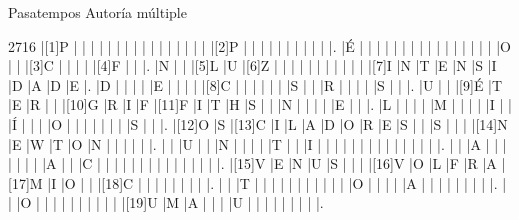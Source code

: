 \Titular*%
{pasatempos}%
{Pasatempos}%
{ Autoría múltiple}%
{}%

\vspace*{-6mm}

\begin{Puzzle}{27}{16}
|[1]P  |{}    |{}    |{}    |{}    |{}    |{}    |{}    |{}    |{}    |{}    |{}    |{}    |{}    |{}    |{}    |{}    |[2]P  |{}    |{}    |{}    |{}    |{}    |{}    |{}    |{}    |{}   |{} |.
|É     |{}    |{}    |{}    |{}    |{}    |{}    |{}    |{}    |{}    |{}    |{}    |{}    |{}    |{}    |{}    |{}    |O     |{}    |{}    |[3]C  |{}    |{}    |{}    |{}    |[4]F  |{}   |{} |.
|N     |{}    |{}    |[5]L  |U     |[6]Z  |{}    |{}    |{}    |{}    |{}    |{}    |{}    |{}    |{}    |{}    |{}    |[7]I  |N     |T     |E     |N     |S     |I     |D     |A     |D    |E  |.
|D     |{}    |{}    |{}    |{}    |E     |{}    |{}    |{}    |{}    |[8]C  |{}    |{}    |{}    |{}    |{}    |{}    |S     |{}    |{}    |R     |{}    |{}    |{}    |{}    |S     |{}   |{} |.
|U     |{}    |{}    |[9]É  |T     |E     |R     |{}    |{}    |[10]G |R     |I     |F     |[11]F |I     |T     |H     |S     |{}    |{}    |N     |{}    |{}    |{}    |{}    |E     |{}   |{} |.
|L     |{}    |{}    |{}    |{}    |M     |{}    |{}    |{}    |{}    |I     |{}    |{}    |Í     |{}    |{}    |{}    |O     |{}    |{}    |{}    |{}    |{}    |{}    |{}    |S     |{}   |{} |.
|[12]O |S     |[13]C |I     |L     |A     |D     |O     |R     |E     |S     |{}    |{}    |S     |{}    |{}    |{}    |[14]N |E     |W     |T     |O     |N     |{}    |{}    |{}    |{}   |{} |.
|{}    |{}    |U     |{}    |{}    |N     |{}    |{}    |{}    |{}    |T     |{}    |{}    |I     |{}    |{}    |{}    |{}    |{}    |{}    |{}    |{}    |{}    |{}    |{}    |{}    |{}   |{} |.
|{}    |{}    |A     |{}    |{}    |{}    |{}    |{}    |{}    |{}    |A     |{}    |{}    |C     |{}    |{}    |{}    |{}    |{}    |{}    |{}    |{}    |{}    |{}    |{}    |{}    |{}   |{} |.
|[15]V |E     |N     |U     |S     |{}    |{}    |{}    |[16]V |O     |L     |F     |R     |A     |[17]M |I     |O     |{}    |{}    |[18]C |{}    |{}    |{}    |{}    |{}    |{}    |{}   |{} |.
|{}    |{}    |T     |{}    |{}    |{}    |{}    |{}    |{}    |{}    |{}    |{}    |{}    |{}    |O     |{}    |{}    |{}    |{}    |A     |{}    |{}    |{}    |{}    |{}    |{}    |{}   |{} |.
|{}    |{}    |O     |{}    |{}    |{}    |{}    |{}    |{}    |{}    |{}    |{}    |{}    |[19]U |M     |A     |{}    |{}    |{}    |U     |{}    |{}    |{}    |{}    |{}    |{}    |{}   |{} |.

\end{Puzzle}
